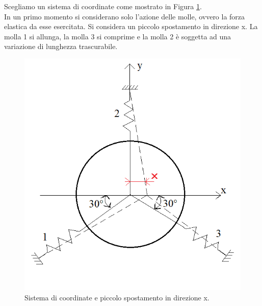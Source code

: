 Scegliamo un sistema di coordinate come mostrato in Figura \ref{SistemaCoordinate}.
\\
In un primo momento si considerano solo l'azione delle molle, ovvero la forza elastica da esse esercitata. 
Si considera un piccolo spostamento in direzione x. La molla 1 si allunga, la molla 3 si comprime e la molla 2 è soggetta ad una variazione di lunghezza trascurabile. 
\begin{figure}[h]
    \centering
    \includegraphics[scale=0.6]{Immagini/Lavatrice3Molle.png}
    \caption{Sistema di coordinate e piccolo spostamento in direzione x.}
    \label{SistemaCoordinate}
\end{figure}

